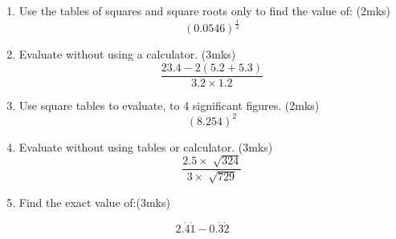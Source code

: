 \documentclass[
  a4paperpaper,
]{scrbook}
\begin{document}
\begin{tcolorbox}[enhanced jigsaw, left=2mm, colframe=quarto-callout-note-color-frame, toptitle=1mm, opacitybacktitle=0.6, rightrule=.15mm, colbacktitle=quarto-callout-note-color!10!white, colback=white, arc=.35mm, breakable, leftrule=.75mm, bottomtitle=1mm, bottomrule=.15mm, title=\textcolor{quarto-callout-note-color}{\faInfo}\hspace{0.5em}{Problem to Solve}, titlerule=0mm, coltitle=black, toprule=.15mm, opacityback=0]

\begin{enumerate}
\def\labelenumi{\arabic{enumi}.}
\item
  Use the tables of squares and square roots only to find the value of:
  (2mks) \[
  \left(0.0546\right)^{\frac{1}{2}}  
  \]
\item
  Evaluate without using a calculator. (3mks) \[
  \frac{23.4-2(5.2+5.3)}{3.2\times 1.2}
  \]
\item
  Use square tables to evaluate, to 4 significant figures. (2mks) \[
  \left(8.254\right)^2  
  \]
\item
  Evaluate without using tables or calculator. (3mks) \[
  \frac{2.5\times\sqrt[]{324}}{3\times\sqrt[]{729}} 
  \]
\item
  Find the exact value of:(3mks)
\end{enumerate}

\[
    2.\dot{4}\dot{1}-0.\dot{3}\dot{2}
\]


\end{tcolorbox}
\end{document}
